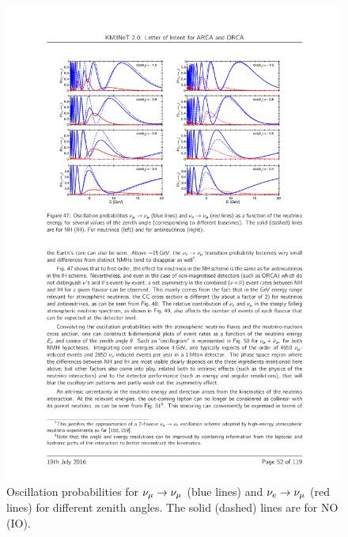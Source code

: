 \begin{figure} [htbp!]
\begin{center}
\includegraphics[width=12cm]{figures/orca_oscprob.pdf}
\caption{\label{fig:orcaoscprob} Oscillation probabilities for $\nu_\mu \rightarrow \nu_\mu$ (blue lines)  and $\nu_e \rightarrow \nu_\mu$ (red lines) for different zenith angles. The solid (dashed) lines are for NO (IO).}
\end{center}
\end{figure}



